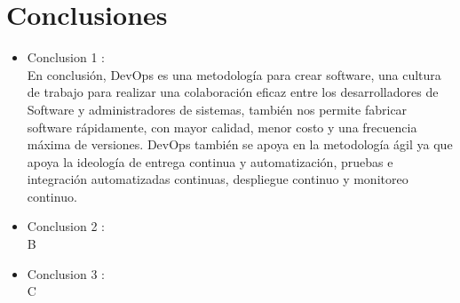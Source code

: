\documentclass[preprint,12pt]{elsarticle}
\begin{document}

\section{Conclusiones}

\begin{itemize}

\item Conclusion 1 : \\
En conclusión, DevOps es una metodología para crear software, una cultura de trabajo para realizar una colaboración eficaz entre los desarrolladores de Software y administradores de sistemas, también nos permite fabricar software rápidamente, con mayor calidad, menor costo y una frecuencia máxima de versiones. DevOps también se apoya en la metodología ágil ya que apoya la ideología de entrega continua y automatización, pruebas e integración automatizadas continuas, despliegue continuo y monitoreo continuo.

\item Conclusion 2 : \\ B

\item Conclusion 3 : \\ C

\end{itemize}


	
	\newpage
	
		 
	
	
\end{document}
